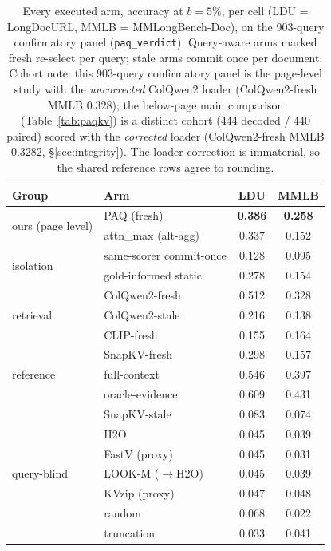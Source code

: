 \documentclass[letterpaper]{article} %
\newcommand{\paq}{\textsc{PAQ}}
\begin{document}
\begin{table}[t]
\centering\small
\setlength{\tabcolsep}{3.5pt}%
\begin{tabular}{llcc}
\toprule
Group & Arm & LDU & MMLB \\
\midrule
\multirow{2}{*}{ours (page level)}
 & \paq{} (fresh) & \textbf{0.386} & \textbf{0.258} \\
 & attn\_max (alt-agg) & 0.337 & 0.152 \\
\midrule
\multirow{2}{*}{isolation}
 & same-scorer commit-once & 0.128 & 0.095 \\
 & gold-informed static & 0.278 & 0.154 \\
\midrule
\multirow{3}{*}{retrieval}
 & ColQwen2-fresh & 0.512 & 0.328 \\
 & ColQwen2-stale & 0.216 & 0.138 \\
 & CLIP-fresh & 0.155 & 0.164 \\
\midrule
\multirow{3}{*}{reference}
 & SnapKV-fresh & 0.298 & 0.157 \\
 & full-context & 0.546 & 0.397 \\
 & oracle-evidence & 0.609 & 0.431 \\
\midrule
\multirow{7}{*}{query-blind}
 & SnapKV-stale & 0.083 & 0.074 \\
 & H2O & 0.045 & 0.039 \\
 & FastV (proxy) & 0.045 & 0.031 \\
 & LOOK-M ($\to$H2O) & 0.045 & 0.039 \\
 & KVzip (proxy) & 0.047 & 0.048 \\
 & random & 0.068 & 0.022 \\
 & truncation & 0.033 & 0.041 \\
\bottomrule
\end{tabular}
\caption{Every executed arm, accuracy at $b{=}5\%$, per cell (LDU = LongDocURL, MMLB = MMLongBench-Doc), on the 903-query confirmatory panel (\texttt{paq\_verdict}). Query-aware arms marked fresh re-select per query; stale arms commit once per document. Cohort note: this 903-query confirmatory panel is the page-level study with the \emph{uncorrected} ColQwen2 loader (ColQwen2-fresh MMLB $0.328$); the below-page main comparison (Table~\ref{tab:paqkv}) is a distinct cohort (444 decoded / 440 paired) scored with the \emph{corrected} loader (ColQwen2-fresh MMLB $0.3282$, \S\ref{sec:integrity}). The loader correction is immaterial, so the shared reference rows agree to rounding.}
\label{tab:panel}
\end{table}
\end{document}

